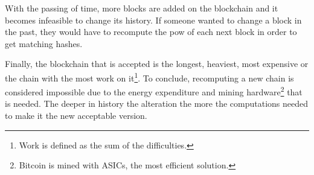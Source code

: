 With the passing of time, more blocks are added on the blockchain and it becomes infeasible to change its history. If someone wanted to change a block in the past, they would have to recompute the \acrshort{pow} of each next block in order to get matching hashes. 

Finally, the blockchain that is accepted is the longest, heaviest, most expensive or the chain with the most work on it\footnote{Work is defined as the sum of the difficulties.}. To conclude, recomputing a new chain is considered impossible due to the energy expenditure and mining hardware\footnote{Bitcoin is mined with ASICs, the most efficient solution.} that is needed. The deeper in history the alteration the more the computations needed to make it the new acceptable version. 